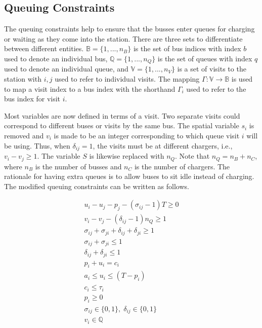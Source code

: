 \documentclass[utf8]{FrontiersinHarvard}
\begin{document}
\subsection{Queuing Constraints} \label{sec:queuing}
\noindent
The queuing constraints help to ensure that the busses enter queues for charging or waiting as they come into the
station. There are three sets to differentiate between different entities. $\mathbb{B} = \{1, ..., n_B\}$ is the set of
bus indices with index $b$ used to denote an individual bus, $\mathbb{Q} = \{1, ..., n_Q\}$ is the set of queues with index $q$
used to denote an individual queue, and $\mathbb{V} = \{1, ..., n_V\}$ is a set of visits to the station with $i,j$ used
to refer to individual visits. The mapping $\Gamma: \mathbb{V} \rightarrow \mathbb{B}$ is used to map a visit index to a bus index with
the shorthand $\Gamma_i$ used to refer to the bus index for visit $i$.

Most variables are now defined in terms of a visit. Two separate visits could correspond to different buses or visits by
the same bus. The spatial variable $s_i$ is removed and $v_i$ is made to be an integer corresponding to which queue
visit $i$ will be using. Thus, when $\delta_{ij} = 1$, the visits must be at different chargers, i.e., $v_i-v_j \geq 1$. The
variable $S$ is likewise replaced with $n_Q$. Note that $n_Q = n_B + n_C$, where $n_B$ is the number of busses and $n_C$
is the number of chargers. The rationale for having extra queues is to allow buses to sit idle instead of charging. The
modified queuing constraints can be written as follows.

\begin{subequations}
\label{eq:packconstrs}
\begin{align}
    u_i - u_j - p_j - (\sigma_{ij} - 1)T \geq 0   \label{subeq:time}         \\
    v_i - v_j - (\delta_{ij} - 1)n_Q \geq 1       \label{subeq:space}        \\
    \sigma_{ij} + \sigma_{ji} + \delta_{ij} + \delta_{ji} \geq 1 \label{subeq:valid_pos}    \\
    \sigma_{ij} + \sigma_{ji} \leq 1                   \label{subeq:sigma}        \\
    \delta_{ij} + \delta_{ji} \leq 1                   \label{subeq:delta}        \\
    p_i + u_i = c_i                       \label{subeq:detach}       \\
    a_i \leq u_i \leq (T - p_i)                 \label{subeq:valid_starts} \\
    c_i \leq \tau_i                             \label{subeq:valid_depart} \\
    p_i \geq 0                               \label{subeq:pos_charge} \\
    \sigma_{ij} \in \{0,1\},\;\delta_{ij} \in \{0,1\}   \label{subeq:sdspace}      \\
    v_i \in \mathbb{Q}                               \label{subeq:vspace}
\end{align}
\end{subequations}
\end{document}
